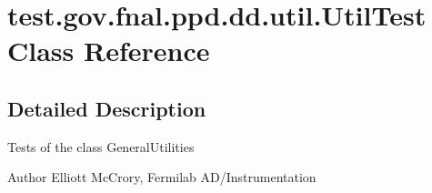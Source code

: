 \hypertarget{classtest_1_1gov_1_1fnal_1_1ppd_1_1dd_1_1util_1_1UtilTest}{\section{test.\-gov.\-fnal.\-ppd.\-dd.\-util.\-Util\-Test Class Reference}
\label{classtest_1_1gov_1_1fnal_1_1ppd_1_1dd_1_1util_1_1UtilTest}
}


\subsection{Detailed Description}
Tests of the class General\-Utilities

\begin{DoxyAuthor}{Author}
Elliott Mc\-Crory, Fermilab A\-D/\-Instrumentation 
\end{DoxyAuthor}

